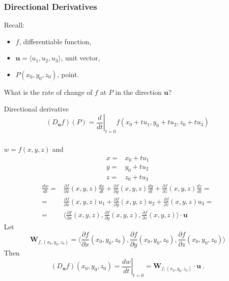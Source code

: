 \begin{frame}
  \frametitle{Directional Derivatives}

Recall:
\begin{itemize}
  \item $f$, differentiable function,
  \item $\textbf{u}=\langle u_1,u_2,u_3 \rangle$, unit vector,
  \item $P(x_0,y_0,z_0)$, point.
\end{itemize}
%
What is the rate of change of $f$ at $P$ in the direction $\textbf{u}$?

\pause
Directional derivative
%
$$(D_{\bm{u}}f)(P) = \left. \frac{d}{dt}\right|_{t=0} f(x_0+tu_1, y_0+tu_2,z_0+tu_3)$$  \end{frame}

\begin{frame}
  \frametitle{}
%
$w =f(x,y,z)$ and
%
\begin{align*}
  x = & x_0 + tu_1 \\
  y = & y_0 + tu_2 \\
  z = & z_0 + tu_3
\end{align*}
%
\pause
%
\begin{align*}
  \frac{dw}{dt} = & \frac{\partial f}{\partial x}(x,y,z) \frac{dx}{dt} + \frac{\partial f}{\partial y}(x,y,z) \frac{dy}{dt} + \frac{\partial f}{\partial z}(x,y,z) \frac{dz}{dt} = \\
  = & \frac{\partial f}{\partial x}(x,y,z) u_1 + \frac{\partial f}{\partial y}(x,y,z) u_2 + \frac{\partial f}{\partial z}(x,y,z) u_3 = \\
  = & \langle \frac{\partial f}{\partial x}(x,y,z) , \frac{\partial f}{\partial y}(x,y,z), \frac{\partial f}{\partial z}(x,y,z)\rangle \cdot \textbf{u}
\end{align*}
%
\pause
Let
%
$$\textbf{W}_{f,(x_0,y_0,z_0)} =\langle \frac{\partial f}{\partial x}(x_0,y_0,z_0) , \frac{\partial f}{\partial y}(x_0,y_0,z_0), \frac{\partial f}{\partial z}(x_0,y_0,z_0)\rangle$$
%
\pause
Then
%
$$(D_{\textbf{u}}f)(x_0,y_0,z_0) = \left. \frac{dw}{dt}\right|_{t=0} = \textbf{W}_{f,(x_0,y_0,z_0)} \cdot \textbf{u}\; .$$
\end{frame}